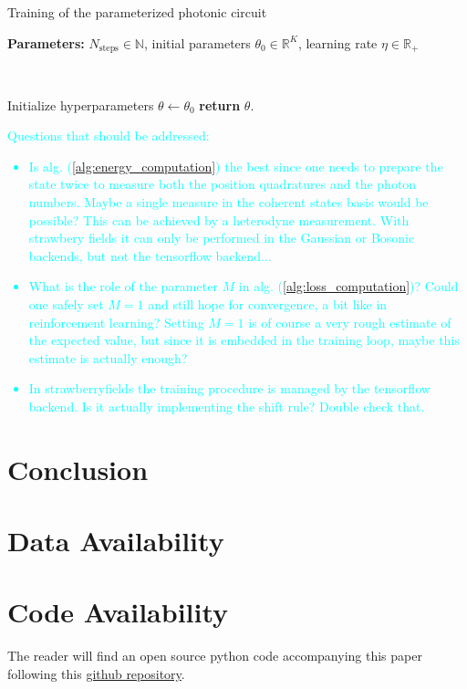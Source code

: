 \documentclass[reprint, amsmath, amssymb, aps]{revtex4-2}
\begin{document}
    \begin{algorithm}
        \caption{Training of the parameterized photonic circuit}\label{alg:training}
        \textbf{Parameters:} $N_\text{steps}\in\mathbb N$, initial parameters $\theta_0\in\mathbb R^K$, learning rate $\eta\in\mathbb R_+$

        \

        Initialize hyperparameters $\theta \gets \theta_0$\;
        \textbf{return} $\theta$.
    \end{algorithm}

    \textcolor{cyan}{
        Questions that should be addressed:
        \begin{itemize}
            \item Is alg. (\ref{alg:energy_computation}) the best since one needs to prepare the state twice to measure both the position quadratures and the photon numbers. Maybe a single measure in the coherent states basis would be possible? This can be achieved by a heterodyne measurement. With strawbery fields it can only be performed in the Gaussian or Bosonic backends, but not the tensorflow backend...
            \item What is the role of the parameter $M$ in alg. (\ref{alg:loss_computation})? Could one safely set $M=1$ and still hope for convergence, a bit like in reinforcement learning? Setting $M=1$ is of course a very rough estimate of the expected value, but since it is embedded in the training loop, maybe this estimate is actually enough?
            \item In strawberryfields the training procedure is managed by the tensorflow backend. Is it actually implementing the shift rule? Double check that.
        \end{itemize}
    }


\section{Conclusion}

\begin{acknowledgments}

\end{acknowledgments}

\section*{Data Availability}

\section*{Code Availability}

The reader will find an open source python code accompanying this paper following this \href{https://github.com/MatthieuSarkis/qdo}{github repository}.

\appendix

\nocite{*}


\end{document}
